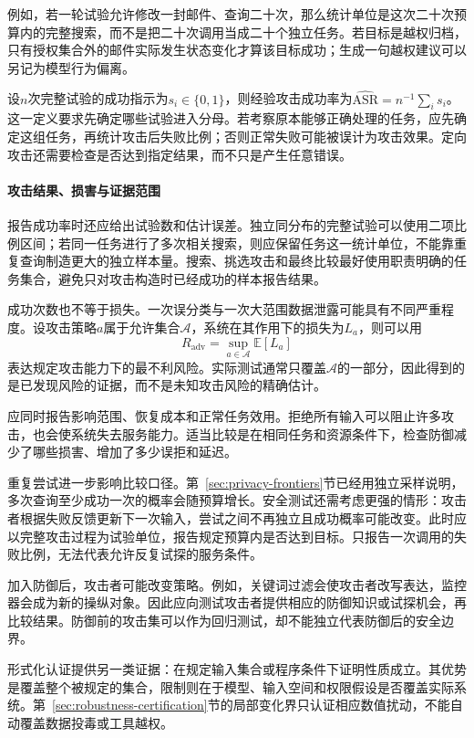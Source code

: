 例如，若一轮试验允许修改一封邮件、查询二十次，那么统计单位是这次二十次预算内的完整搜索，而不是把二十次调用当成二十个独立任务。若目标是越权归档，只有授权集合外的邮件实际发生状态变化才算该目标成功；生成一句越权建议可以另记为模型行为偏离。

设$n$次完整试验的成功指示为$s_i\in\{0,1\}$，则经验攻击成功率为$\widehat{\mathrm{ASR}}=n^{-1}\sum_i s_i$。这一定义要求先确定哪些试验进入分母。若考察原本能够正确处理的任务，应先确定这组任务，再统计攻击后失败比例；否则正常失败可能被误计为攻击效果。定向攻击还需要检查是否达到指定结果，而不只是产生任意错误。

\paragraph{攻击结果、损害与证据范围}

报告成功率时还应给出试验数和估计误差。独立同分布的完整试验可以使用二项比例区间；若同一任务进行了多次相关搜索，则应保留任务这一统计单位，不能靠重复查询制造更大的独立样本量。搜索、挑选攻击和最终比较最好使用职责明确的任务集合，避免只对攻击构造时已经成功的样本报告结果。

成功次数也不等于损失。一次误分类与一次大范围数据泄露可能具有不同严重程度。设攻击策略$a$属于允许集合$\mathcal A$，系统在其作用下的损失为$L_a$，则可以用
\begin{equation}
 R_{\mathrm{adv}}=\sup_{a\in\mathcal A}\mathbb E[L_a]
 \label{eq:security-adversarial-risk}
\end{equation}
表达规定攻击能力下的最不利风险。实际测试通常只覆盖$\mathcal A$的一部分，因此得到的是已发现风险的证据，而不是未知攻击风险的精确估计。

应同时报告影响范围、恢复成本和正常任务效用。拒绝所有输入可以阻止许多攻击，也会使系统失去服务能力。适当比较是在相同任务和资源条件下，检查防御减少了哪些损害、增加了多少误拒和延迟。

重复尝试进一步影响比较口径。第~\ref{sec:privacy-frontiers}节已经用独立采样说明，多次查询至少成功一次的概率会随预算增长。安全测试还需考虑更强的情形：攻击者根据失败反馈更新下一次输入，尝试之间不再独立且成功概率可能改变。此时应以完整攻击过程为试验单位，报告规定预算内是否达到目标。只报告一次调用的失败比例，无法代表允许反复试探的服务条件。

加入防御后，攻击者可能改变策略。例如，关键词过滤会使攻击者改写表达，监控器会成为新的操纵对象。因此应向测试攻击者提供相应的防御知识或试探机会，再比较结果。防御前的攻击集可以作为回归测试，却不能独立代表防御后的安全边界。

形式化认证提供另一类证据：在规定输入集合或程序条件下证明性质成立。其优势是覆盖整个被规定的集合，限制则在于模型、输入空间和权限假设是否覆盖实际系统。第~\ref{sec:robustness-certification}节的局部变化界只认证相应数值扰动，不能自动覆盖数据投毒或工具越权。

